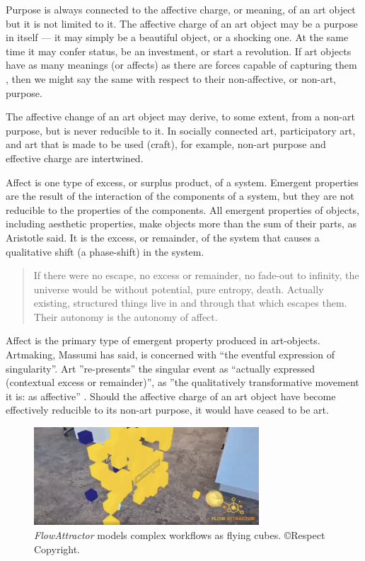 \documentclass[letterpaper]{article}
\begin{document}
    Purpose is always connected to the affective charge, or meaning, of an art object but it is not limited to it. The affective charge of an art object may be a purpose in itself — it may simply be a beautiful object, or a shocking one. At the same time it may confer status, be an investment, or start a revolution. If art objects have as many meanings (or affects) as there are forces capable of capturing them \citep[p.4]{DeleuzeNtschAndPhlsphy2006}, then we might say the same with respect to their non-affective, or non-art, purpose.

    The affective change of an art object may derive, to some extent, from a non-art purpose, but is never reducible to it. In socially connected art, participatory art, and art that is made to be used (craft), for example, non-art purpose and effective charge are intertwined.

    Affect is one type of excess, or surplus product, of a system. Emergent properties are the result of the interaction of the components of a system, but they are not reducible to the properties of the components. All emergent properties of objects, including aesthetic properties, make objects more than the sum of their parts, as Aristotle said. It is the excess, or remainder, of the system that causes a qualitative shift (a phase-shift) in the system.

    \begin{quote}
        If there were no escape, no excess or remainder, no fade-out to infinity, the universe would be without potential, pure entropy, death. Actually existing, structured things live in and through that which escapes them. Their autonomy is the autonomy of affect. \citep[pp.96-97]{MassumiTheAtnmyOfAffct1995}
    \end{quote}

    Affect is the primary type of emergent property produced in art-objects. Artmaking, Massumi has said, is concerned with “the eventful expression of singularity”. Art ”re-presents” the singular event as “actually expressed (contextual excess or remainder)”, as ”the qualitatively transformative movement it is: as affective” \citep[p.252]{MassumiPrblsFrThVrtl2002}. Should the affective charge of an art object have become effectively reducible to its non-art purpose, it would have ceased to be art.

    \begin{figure}[h]
    \includegraphics[width=3.31in]{flow-attractor.png}
    \caption{\emph{FlowAttractor} models complex workflows as flying cubes. \copyright Respect Copyright.}
    \end{figure}
\end{document}

